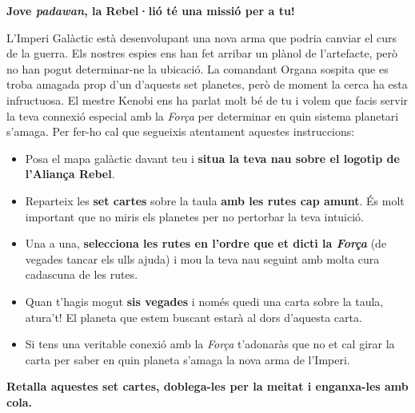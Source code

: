 \documentclass[a4paper, 10pt]{article}
\begin{document}
    {\large \begin{center}{\Large \textbf{Jove \emph{padawan}, la Rebel·lió té una missió per a tu!}}\end{center}

    L'Imperi Galàctic està desenvolupant una nova arma que podria canviar el curs de la guerra. Els nostres espies ens han fet arribar un plànol de l'artefacte, però no han pogut determinar-ne la ubicació. La comandant Organa sospita que es troba amagada prop d'un d'aquests set planetes, però de moment la cerca ha esta infructuosa. El mestre Kenobi ens ha parlat molt bé de tu i volem que facis servir la teva connexió especial amb la \emph{Força} per determinar en quin sistema planetari s'amaga. Per fer-ho cal que segueixis atentament aquestes instruccions:

    \begin{itemize}
        \item Posa el mapa galàctic davant teu i \textbf{situa la teva nau sobre el logotip de l'Aliança Rebel}.
        \item Reparteix les \textbf{set cartes} sobre la taula \textbf{amb les rutes cap amunt}. És molt important que no miris els planetes per no pertorbar la teva intuició.
        \item Una a una, \textbf{selecciona les rutes en l'ordre que et dicti la \emph{Força}} (de vegades tancar els ulls ajuda) i mou la teva nau seguint amb molta cura cadascuna de les rutes.
        \item Quan t'hagis mogut \textbf{sis vegades} i només quedi una carta sobre la taula, atura't! El planeta que estem buscant estarà al dors d'aquesta carta.
        \item Si tens una veritable conexió amb la \emph{Força} t'adonaràs que no et cal girar la carta per saber en quin planeta s'amaga la nova arma de l'Imperi.
    \end{itemize}}

    
    \newpage
    \thispagestyle{empty}

    \begin{center}
        {\Large \textbf{Retalla aquestes set cartes, doblega-les per la meitat i enganxa-les amb cola.}}
    \end{center}

    \bigskip\bigskip
\end{document}
